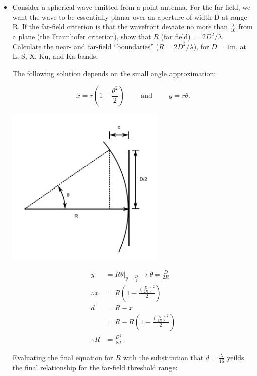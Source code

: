 \documentclass[letterpaper,10pt]{article}\usepackage[]{graphicx}\usepackage[]{color}
\newcommand{\question}[3]{
\begin{itemize}
\item[{\makebox[1cm]{#1)}}] #2

\vspace{.2in}

#3

\end{itemize}

\vspace{.2in}
}
\begin{document}
\question{2.6}{
Consider a spherical wave emitted from a point antenna.  For the far field, we want the wave to be essentially planar over an aperture of width D at range R.  If the far-field criterion is that the wavefront deviate no more than $\frac{\lambda}{16}$ from a plane (the Fraunhofer criterion), show that $R$ (far field) $= 2D^2/\lambda$.  Calculate the near- and far-field ``boundaries'' ($R=2D^2/\lambda$), for $D=1$m, at L, S, X, Ku, and Ka bands.
}{

The following solution depends on the small angle approximation:

\begin{equation*}
x = r\left(1-\frac{\theta^2}{2}\right) \qquad \text{ and } \qquad y = r\theta \text{.}
\end{equation*}

\begin{minipage}{3in}
\begin{center}
\includegraphics[width=3in]{Figures/HW2_2_6__1.pdf}
\end{center}
\end{minipage}
\begin{minipage}{3in}

\begin{align*}
y & = \left.R\theta\right|_{y=\frac{D}{2}} \rightarrow \theta = \frac{D}{2R} \\
\therefore x & = R\left(1-\frac{\left(\frac{D}{2R}\right)^2}{2}\right) \\
d & = R - x \\
& = R - R\left(1-\frac{\left(\frac{D}{2R}\right)^2}{2}\right) \\
\therefore R & = \frac{D^2}{8d}
\end{align*}
\end{minipage}

Evaluating the final equation for $R$ with the substitution that $d=\frac{\lambda}{16}$ yeilds the final relationship for the far-field threshold range:

}
\end{document}
